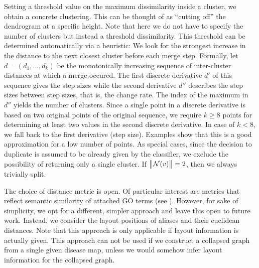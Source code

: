 \documentclass[
	fontsize=10pt, %
	twoside=true, %
	secnumdepth=1, %
  toc=indentunnumbered %
]{kaobook}
\begin{document}
Setting a threshold value on the maximum dissimilarity inside a cluster, we
obtain a concrete clustering. This can be thought of as ``cutting off'' the
dendrogram at a specific height. Note that here we do not have to specify the
number of clusters but instead a threshold dissimilarity. This threshold can be
determined automatically via a heuristic:
We look for the strongest increase in the distance to the next closest cluster
before each merge step. Formally, let $d = (d_1, ..., d_k)$ be the monotonically
increasing sequence of inter-cluster distances at which a merge occured. The
first discrete derivative $d'$ of this sequence gives the step sizes while the
second derivative $d''$ describes the step sizes between step sizes, that is,
the change rate. The index of the maximum in $d''$ yields the number of
clusters. Since a single point in a discrete derivative is based on two original
points of the original sequence, we require $k \geq 8$ points for determining at least two
values in the second discrete derivative. In case of $k < 8$, we fall back to
the first derivative (step size). Examples show that this is a good
approximation for a low number of points.
%
As special cases, since the decision to duplicate is assumed to be already given
by the classifier, we exclude the possibility of returning only a single
cluster. If~$\norm{\mathcal{N}(v)}=2$, then we always trivially split. 

The choice of distance metric is open. Of particular interest are metrics that
reflect semantic similarity of attached GO terms
(see ).
However, for sake of simplicity, we opt for a different, simpler approach and
leave this open to future work. Instead, we consider the layout positions of
aliases and their euclidean distances. Note that this approach is only
applicable if layout information is actually given. This approach can not be
used if we construct a collapsed graph from a single given disease map, unless
we would somehow infer layout information for the collapsed graph.
\end{document}
